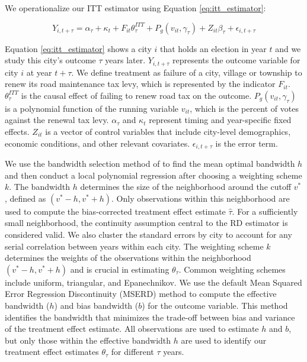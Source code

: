 We operationalize our ITT estimator using Equation \ref{eq:itt_estimator}:
  
\begin{equation}
Y_{i,t+\tau} = \alpha_\tau + \kappa_t + F_{it} \theta_{\tau}^{ITT} + P_g (v_{it}, \gamma_\tau) + Z_{it} \beta_\tau + \epsilon_{i,t + \tau}
\label{eq:itt_estimator}
\end{equation}

\noindent Equation \ref{eq:itt_estimator} shows a city $i$ that holds an election in year $t$ and we study this city's outcome $\tau$ years later. $Y_{i,t+\tau}$ represents the outcome variable for city $i$ at year $t + \tau$. We define treatment as failure of a city, village or township to renew its road maintenance tax levy, which is represented by the indicator $F_{it}$. $\theta_{\tau}^{ITT}$ is the causal effect of failing to renew road tax on the outcome. $P_g (v_{it}, \gamma_\tau)$ is a polynomial function of the running variable $v_{it}$, which is the percent of votes against the renewal tax levy. $\alpha_\tau$ and $\kappa_t$ represent timing and year-specific fixed effects. $Z_{it}$ is a vector of control variables that include city-level demographics, economic conditions, and other relevant covariates. $\epsilon_{i,t + \tau}$ is the error term.

We use the bandwidth selection method of \cite{calonico2019regression} to find the mean optimal bandwidth $h$ and then conduct a local polynomial regression after choosing a weighting scheme $k$. The bandwidth $h$ determines the size of the neighborhood around the cutoff $v^*$, defined as $(v^* - h, v^* + h)$. Only observations within this neighborhood are used to compute the bias-corrected treatment effect estimate $\hat{\tau}$. For a sufficiently small neighborhood, the continuity assumption central to the RD estimator is considered valid. We also cluster the standard errors by city to account for any serial correlation between years within each city. The weighting scheme $k$ determines the weights of the observations within the neighborhood $(v^* - h, v^* + h)$ and is crucial in estimating $\theta_{\tau}$. Common weighting schemes include uniform, triangular, and Epanechnikov. We use the default Mean Squared Error Regression Discontinuity (MSERD) method to compute the effective bandwidth ($h$) and bias bandwidth ($b$) for the outcome variable. This method identifies the bandwidth that minimizes the trade-off between bias and variance of the treatment effect estimate. All observations are used to estimate $h$ and $b$, but only those within the effective bandwidth $h$ are used to identify our treatment effect estimates $\theta_\tau$ for different $\tau$ years.

